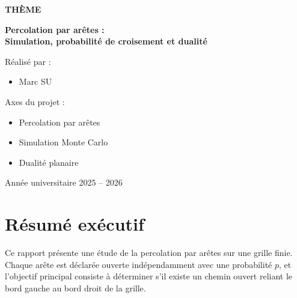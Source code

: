 \documentclass[11pt,a4paper]{report}
\begin{document}
\begin{titlepage}
{\Large\bfseries\color{or} THÈME\par}

\vspace{0.4cm}

{\Huge\bfseries\color{bleufonce}
Percolation par arêtes :\\[0.2cm]
Simulation, probabilité de croisement et dualité
\par}

\vfill

\vspace{-1.2cm}

\noindent
\begin{minipage}[t]{0.45\textwidth}
\raggedright
{\large Réalisé par :\par}
\vspace{0.35cm}
\begin{itemize}
    \item Marc SU
\end{itemize}
\end{minipage}
\hfill
\begin{minipage}[t]{0.45\textwidth}
\raggedright
{\large Axes du projet :\par}
\vspace{0.35cm}
\begin{itemize}
    \item Percolation par arêtes
    \item Simulation Monte Carlo
    \item Dualité planaire
\end{itemize}
\end{minipage}

\vspace{1.5cm}

{\large Année universitaire 2025 -- 2026\par}

\end{titlepage}

\chapter*{Résumé exécutif}

Ce rapport présente une étude de la percolation par arêtes sur une grille finie. Chaque arête est déclarée ouverte indépendamment avec une probabilité $p$, et l'objectif principal consiste à déterminer s'il existe un chemin ouvert reliant le bord gauche au bord droit de la grille.
\end{document}
